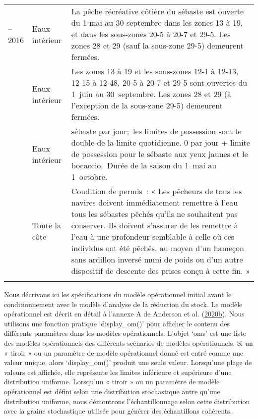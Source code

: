\documentclass[french,11pt]{book}
\begin{document}
\begin{longtable}[t]{>{\raggedright\arraybackslash}p{3.5cm}>{\raggedright\arraybackslash}p{3.5cm}>{\raggedright\arraybackslash}p{7.5cm}}
2008--2016 & Eaux intérieur & La pêche récréative côtière du sébaste est ouverte du 1 mai au 30 septembre dans les zones 13 à 19, et dans les sous-zones 20-5 à 20-7 et 29-5. Les zones 28 et 29 (sauf la sous-zone 29-5) demeurent fermées.\\
2017 & Eaux intérieur & Les zones 13 à 19 et les sous-zones 12-1 à 12-13, 12-15 à 12-48, 20-5 à 20-7 et 29-5 sont ouvertes du 1 juin au 30 septembre. Les zones 28 et 29 (à l'exception de la sous-zone 29-5) demeurent fermées.\\
2019 & Eaux intérieur & 1 sébaste par jour; les limites de possession sont le double de la limite quotidienne. 0 par jour + limite de possession pour le sébaste aux yeux jaunes et le bocaccio. Durée de la saison du 1 mai au 1 octobre.\\
2019 & Toute la côte & Condition de permis~: « Les pêcheurs de tous les navires doivent immédiatement remettre à l'eau tous les sébastes pêchés qu'ils ne souhaitent pas conserver. Ils doivent s'assurer de les remettre à l'eau à une profondeur semblable à celle où ces individus ont été pêchés, au moyen d'un hameçon sans ardillon inversé muni de poids ou d'un autre dispositif de descente des prises conçu à cette fin. »\\*
\end{longtable}
\clearpage


\clearpage

\label{app:desc-om-yelloweye}

Nous décrivons ici les spécifications du modèle opérationnel initial avant le conditionnement avec le modèle d'analyse de la réduction du stock. Le modèle opérationnel est décrit en détail à l'annexe A de Anderson et al. (\protect\hyperlink{ref-anderson2020gfmp}{2020}\protect\hyperlink{ref-anderson2020gfmp}{b}). Nous utilisons une fonction pratique `display\_om()' pour afficher le contenu des différents paramètres dans les modèles opérationnels. L'objet `oms' est une liste des modèles opérationnels des différents scénarios de modèles opérationnels. Si un « tiroir » ou un paramètre de modèle opérationnel donné est entré comme une valeur unique, alors `display\_om()' produit une seule valeur. Lorsqu'une plage de valeurs est affichée, elle représente les limites inférieure et supérieure d'une distribution uniforme. Lorsqu'un « tiroir » ou un paramètre de modèle opérationnel est défini selon une distribution stochastique autre qu'une distribution uniforme, nous démontrons l'échantillonnage selon cette distribution avec la graine stochastique utilisée pour générer des échantillons cohérents.
\end{document}
